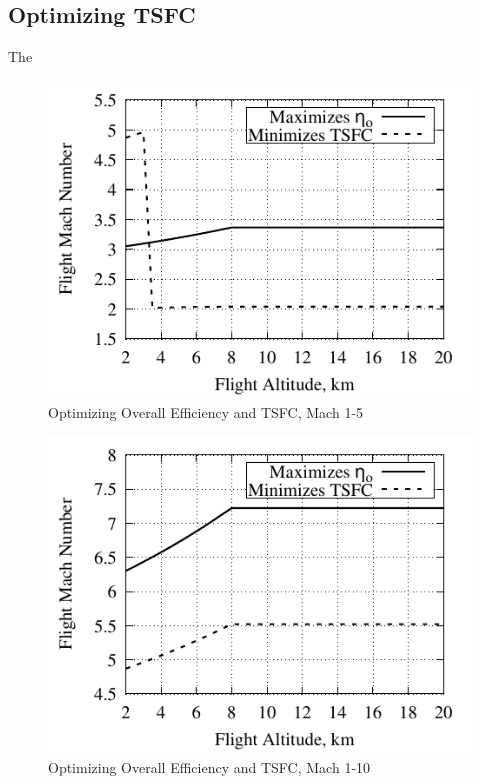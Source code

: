 \documentclass[conf]{new-aiaa} %
\begin{document}
\subsection{Optimizing TSFC} %
The

\begin{figure}[hbt!] %
    \centering
    \includegraphics[]{media/performance_parameter_files/part_e_range_1_5.pdf}
    \caption{\label{fig:parte1-5}Optimizing Overall Efficiency and TSFC, Mach 1-5}
\end{figure}

\begin{figure}[hbt!] %
    \centering
    \includegraphics[]{media/performance_parameter_files/part_e_range_1_10.pdf}
    \caption{\label{fig:parte1-10}Optimizing Overall Efficiency and TSFC, Mach 1-10}
\end{figure}
\end{document}
